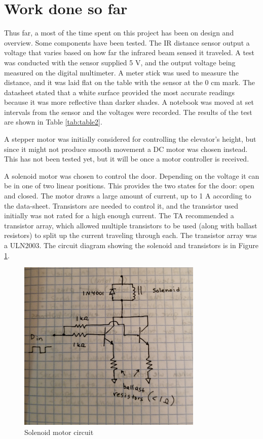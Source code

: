 \documentclass{article}
\begin{document}
	\section{Work done so far}
	Thus far, a most of the time spent on this project has been on design and overview. Some components have been tested. The IR distance sensor output a voltage that varies based on how far the infrared beam sensed it traveled. A test was conducted with the sensor supplied 5 V, and the output voltage being measured on the digital multimeter. A meter stick was used to measure the distance, and it was laid flat on the table with the sensor at the 0 cm mark. The datasheet\cite{project_overview:IR_datasheet} stated that a white surface provided the most accurate readings because it was more reflective than darker shades. A notebook was moved at set intervals from the sensor and the voltages were recorded. The results of the test are shown in Table \ref{tab:table2}.
	
    A stepper motor was initially considered for controlling the elevator's height, but since it might not produce smooth movement a DC motor was chosen instead. This has not been tested yet, but it will be once a motor controller is received.
    
    A solenoid motor\cite{project_overview:solenoid_datasheet} was chosen to control the door. Depending on the voltage it can be in one of two linear positions. This provides the two states for the door: open and closed. The motor draws a large amount of current, up to 1 A according to the data-sheet. Transistors are needed to control it, and the transistor used initially was not rated for a high enough current. The TA recommended a transistor array, which allowed multiple transistors to be used (along with ballast resistors) to split up the current traveling through each. The transistor array was a ULN2003\cite{project_overview:uln2003_datasheet}. The circuit diagram showing the solenoid and transistors is in Figure \ref{fig:solenoid}.
    
	\begin{figure}[h!]
	    \begin{center}

		\includegraphics[width=250pt]{solenoid.jpg}
		\caption{Solenoid motor circuit}
		\label{fig:solenoid}
	    \end{center}
	\end{figure}
	
\end{document}
